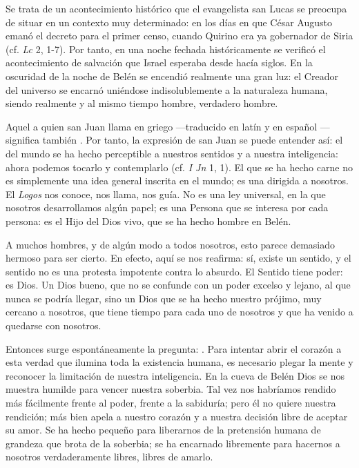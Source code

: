 \begin{body}
\begin{body}
Se trata de un acontecimiento histórico que el evangelista san Lucas se preocupa de situar en un contexto muy determinado: en los días en que César Augusto emanó el decreto para el primer censo, cuando Quirino era ya gobernador de Siria (cf. \emph{Lc} 2, 1-7). Por tanto, en una noche fechada históricamente se verificó el acontecimiento de salvación que Israel esperaba desde hacía siglos. En la oscuridad de la noche de Belén se encendió realmente una gran luz: el Creador del universo se encarnó uniéndose indisolublemente a la naturaleza humana, siendo realmente  y al mismo tiempo hombre, verdadero hombre.

Aquel a quien san Juan llama en griego  ---traducido en latín  y en español  --- significa también . Por tanto, la expresión de san Juan se puede entender así: el  del mundo se ha hecho perceptible a nuestros sentidos y a nuestra inteligencia: ahora podemos tocarlo y contemplarlo (cf. \emph{I Jn} 1, 1). El  que se ha hecho carne no es simplemente una idea general inscrita en el mundo; es una  dirigida a nosotros. El \emph{Logos} nos conoce, nos llama, nos guía. No es una ley universal, en la que nosotros desarrollamos algún papel; es una Persona que se interesa por cada persona: es el Hijo del Dios vivo, que se ha hecho hombre en Belén.

A muchos hombres, y de algún modo a todos nosotros, esto parece demasiado hermoso para ser cierto. En efecto, aquí se nos reafirma: sí, existe un sentido, y el sentido no es una protesta impotente contra lo absurdo. El Sentido tiene poder: es Dios. Un Dios bueno, que no se confunde con un poder excelso y lejano, al que nunca se podría llegar, sino un Dios que se ha hecho nuestro prójimo, muy cercano a nosotros, que tiene tiempo para cada uno de nosotros y que ha venido a quedarse con nosotros.

Entonces surge espontáneamente la pregunta: . Para intentar abrir el corazón a esta verdad que ilumina toda la existencia humana, es necesario plegar la mente y reconocer la limitación de nuestra inteligencia. En la cueva de Belén Dios se nos muestra  humilde para vencer nuestra soberbia. Tal vez nos habríamos rendido más fácilmente frente al poder, frente a la sabiduría; pero él no quiere nuestra rendición; más bien apela a nuestro corazón y a nuestra decisión libre de aceptar su amor. Se ha hecho pequeño para liberarnos de la pretensión humana de grandeza que brota de la soberbia; se ha encarnado libremente para hacernos a nosotros verdaderamente libres, libres de amarlo.


\end{body}
\end{body}
